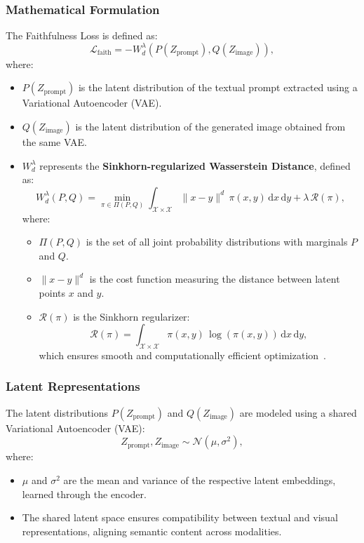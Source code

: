 \subsubsection{Mathematical Formulation}
The Faithfulness Loss is defined as:
\[
\mathcal{L}_{\text{faith}} = -W_d^\lambda(P(Z_{\text{prompt}}), Q(Z_{\text{image}})),
\]
where:
\begin{itemize}
    \item \(P(Z_{\text{prompt}})\) is the latent distribution of the textual prompt extracted using a Variational Autoencoder (VAE).
    \item \(Q(Z_{\text{image}})\) is the latent distribution of the generated image obtained from the same VAE.
    \item \(W_d^\lambda\) represents the \textbf{Sinkhorn-regularized Wasserstein Distance}, defined as:
    \[
    W_d^\lambda(P, Q) = \min_{\pi \in \Pi(P, Q)} \int_{\mathcal{X} \times \mathcal{X}} \|x - y\|^d \,\pi(x, y) \, \mathrm{d}x \, \mathrm{d}y + \lambda \, \mathcal{R}(\pi),
    \]
    where:
    \begin{itemize}
        \item \(\Pi(P, Q)\) is the set of all joint probability distributions with marginals \(P\) and \(Q\).
        \item \(\|x - y\|^d\) is the cost function measuring the distance between latent points \(x\) and \(y\).
        \item \(\mathcal{R}(\pi)\) is the Sinkhorn regularizer:
        \[
        \mathcal{R}(\pi) = \int_{\mathcal{X} \times \mathcal{X}} \pi(x, y) \, \log(\pi(x, y)) \, \mathrm{d}x \, \mathrm{d}y,
        \]
        which ensures smooth and computationally efficient optimization~\cite{cuturi2013sinkhorn}.
    \end{itemize}
\end{itemize}

\subsubsection{Latent Representations}
The latent distributions \(P(Z_{\text{prompt}})\) and \(Q(Z_{\text{image}})\) are modeled using a shared Variational Autoencoder (VAE):
\[
Z_{\text{prompt}}, Z_{\text{image}} \sim \mathcal{N}(\mu, \sigma^2),
\]
where:
\begin{itemize}
    \item \(\mu\) and \(\sigma^2\) are the mean and variance of the respective latent embeddings, learned through the encoder.
    \item The shared latent space ensures compatibility between textual and visual representations, aligning semantic content across modalities.
\end{itemize}

